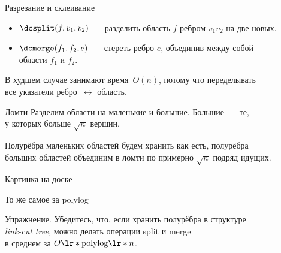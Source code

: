 \begin{frame}{Разрезание и склеивание}
\begin{itemize}
	\item \(\dcsplit (f,v_1,v_2)\)~— разделить область \(f\) ребром \(v_1v_2\) на две новых.
	\item \(\dcmerge (f_1,f_2,e)\)~— стереть ребро \(e\), объединив между собой \\
	   области \(f_1\) и \(f_2\).
\end{itemize}
\begin{center}  \end{center} \vspace{-3mm}

	В худшем случае занимают время~\(O(n)\), потому что переделывать \\
	все указатели ребро~\(\leftrightarrow\) область.
\end{frame}

\begin{frame}{Ломти}
	Разделим области на \alert{маленькие} и \alert{большие}. Большие~— те,\\
	у которых больше \(\sqrt{n}\) вершин.

	Полурёбра маленьких областей будем хранить как есть, полурёбра\\
	больших областей объединим в \alert{ломти} по примерно \(\sqrt{n}\) подряд идущих. \bigskip

	{\footnotesize \textcolor{white!46!dgray}{Картинка на доске}}
\end{frame}

\begin{frame}{То же самое за polylog}
\begin{block}{Упражнение.}
	Убедитесь, что, если хранить полурёбра в структуре\\
	{\it link-cut tree,} можно делать операции split и merge\\
	в среднем за \(O\lr*{\text{polylog}\lr*{n}}\).
\end{block}
\end{frame}
